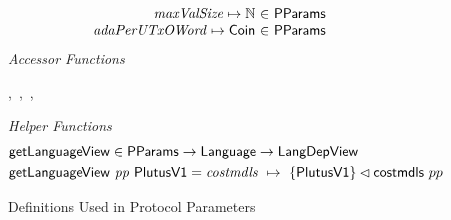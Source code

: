 \begin{figure*}[htb]
\begin{equation*}
\begin{array}{r@{~\in~}l@{\qquad}r}
        \var{maxValSize} \mapsto \N & \PParams \\
        \var{adaPerUTxOWord} \mapsto \Coin & \PParams \\
      \end{array}
  \end{equation*}
  \emph{Accessor Functions}
  \begin{center}
  ,~,~,~
  \end{center}
  \emph{Helper Functions}
  \begin{align*}
    & \mathsf{getLanguageView} \in \mathsf{PParams} \to \mathsf{Language} \to \mathsf{LangDepView} \\
    & \mathsf{getLanguageView}~\mathit{pp}~\mathsf{PlutusV1} = \mathit{costmdls}~\mapsto~\{\mathsf{PlutusV1}\} \lhd \mathsf{costmdls}~{pp}
  \end{align*}
  \caption{Definitions Used in Protocol Parameters}
  \label{fig:defs:protocol-parameters}
\end{figure*}
